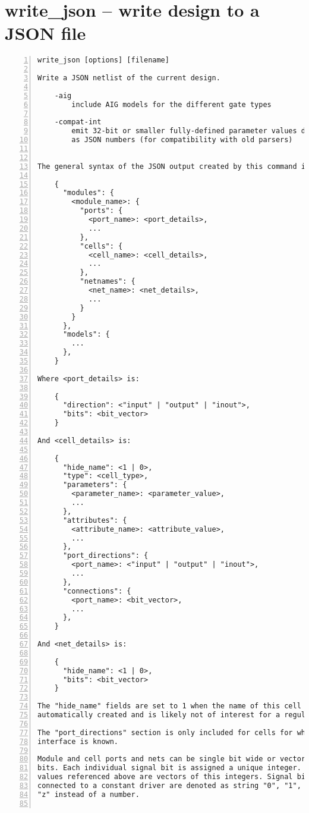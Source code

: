 \section{write\_json -- write design to a JSON file}
\label{cmd:write_json}
\begin{lstlisting}[numbers=left,frame=single]
    write_json [options] [filename]

Write a JSON netlist of the current design.

    -aig
        include AIG models for the different gate types

    -compat-int
        emit 32-bit or smaller fully-defined parameter values directly
        as JSON numbers (for compatibility with old parsers)


The general syntax of the JSON output created by this command is as follows:

    {
      "modules": {
        <module_name>: {
          "ports": {
            <port_name>: <port_details>,
            ...
          },
          "cells": {
            <cell_name>: <cell_details>,
            ...
          },
          "netnames": {
            <net_name>: <net_details>,
            ...
          }
        }
      },
      "models": {
        ...
      },
    }

Where <port_details> is:

    {
      "direction": <"input" | "output" | "inout">,
      "bits": <bit_vector>
    }

And <cell_details> is:

    {
      "hide_name": <1 | 0>,
      "type": <cell_type>,
      "parameters": {
        <parameter_name>: <parameter_value>,
        ...
      },
      "attributes": {
        <attribute_name>: <attribute_value>,
        ...
      },
      "port_directions": {
        <port_name>: <"input" | "output" | "inout">,
        ...
      },
      "connections": {
        <port_name>: <bit_vector>,
        ...
      },
    }

And <net_details> is:

    {
      "hide_name": <1 | 0>,
      "bits": <bit_vector>
    }

The "hide_name" fields are set to 1 when the name of this cell or net is
automatically created and is likely not of interest for a regular user.

The "port_directions" section is only included for cells for which the
interface is known.

Module and cell ports and nets can be single bit wide or vectors of multiple
bits. Each individual signal bit is assigned a unique integer. The <bit_vector>
values referenced above are vectors of this integers. Signal bits that are
connected to a constant driver are denoted as string "0", "1", "x", or
"z" instead of a number.


\end{lstlisting}
